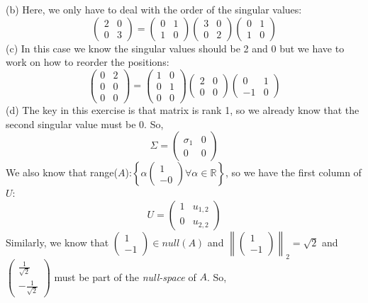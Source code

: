 \documentclass{article}
\begin{document}
\begin{enumerate}
(b) Here, we only have to deal with the order of the singular values:
$$\left( \begin{array}{cc} 2 & 0 \\ 0 &  3  \end{array} \right) = 
\left( \begin{array}{cc} 0 & 1 \\ 1 & 0  \end{array} \right)
\left( \begin{array}{cc} 3 & 0 \\ 0 & 2  \end{array} \right)
\left( \begin{array}{cc} 0 & 1 \\ 1 & 0  \end{array} \right)$$
(c) In this case we know the singular values should be 2 and 0 but we have to work on how to reorder the positions:
$$\left( \begin{array}{cc} 0 & 2 \\ 0 & 0 \\ 0 & 0  \end{array} \right) = 
\left( \begin{array}{cc} 1 & 0 \\ 0 & 1 \\ 0 & 0  \end{array} \right)
\left( \begin{array}{cc} 2 & 0 \\ 0 & 0  \end{array} \right)
\left( \begin{array}{cc} 0 & 1 \\ -1 & 0  \end{array} \right)$$
(d) The key in this exercise is that matrix is rank 1, so we already know that the second singular value must be 0. So,
$$\Sigma = \left( \begin{array}{cc} \sigma_1 & 0 \\ 0 & 0  \end{array} \right)$$
We also know that range($A$):$\left\{\alpha \begin{pmatrix} 1 \\ -0  \end{pmatrix} \forall \alpha \in \mathbb{R} \right\}$, so we have the first column of $U$:
$$U = \left( \begin{array}{cc} 1 & u_{1,2} \\ 0 & u_{2,2}  \end{array} \right)$$
Similarly, we know that $\begin{pmatrix} 1 \\ -1  \end{pmatrix} \in null(A)$ and $\left\| \begin{pmatrix} 1 \\ -1  \end{pmatrix} \right\|_2=\sqrt{2}$ and $\begin{pmatrix} \frac{1}{\sqrt{2}} \\ -\frac{1}{\sqrt{2}} \end{pmatrix}$ must be part of the \textit{null-space} of $A$. So,

\end{enumerate}
\end{document}
